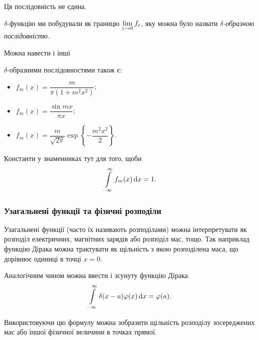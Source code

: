 \begin{remark}
	Ця послідовність не єдина.
\end{remark}

\begin{remark}
	$\delta$-функцію ми побудували як границю $\displaystyle\lim\limits_{\varepsilon \to 0} f_\varepsilon$, яку можна було назвати \it{$\delta$-образною} послідовністю.
\end{remark}

Можна навести і інші
\begin{examples}
	$\delta$-образними послідовностями також є:
	\begin{itemize}
		\item $f_m(x) = \dfrac{m}{\pi (1 + m^2 x^2)}$;
		\item $f_m(x) = \dfrac{\sin m x}{\pi x}$;
		\item $f_m(x) = \dfrac{m}{\sqrt{2 \pi}} \exp \left\{ - \dfrac{m^2 x^2}{2}\right\}$.
	\end{itemize}
\end{examples}

\begin{remark}
	Константи у знаменниках тут для того, щоби
	\begin{equation}
		\displaystyle\int\limits_{-\infty}^\infty f_m(x) \mathop{}\!\mathrm{d} x = 1.
	\end{equation}
\end{remark}
 	  		 
\subsubsection{Узагальнені функції та фізичні розподіли}

Узагальнені функції (часто їх називають розподілами) можна інтерпретувати як розподіл електричних, магнітних зарядів або розподіл мас, тощо. Так наприклад функцію Дірака можна трактувати як щільність з якою розподілена маса, що дорівнює одиниці в точці $x = 0$. 

\begin{definition}
	Аналогічним чином можна ввести і зсунуту функцію Дірака.
	\begin{equation}
		\displaystyle\int\limits_{-\infty}^\infty \delta(x - a) \varphi(x) \mathop{}\!\mathrm{d} x = \varphi(a).
	\end{equation}
\end{definition}

\begin{remark}
	Використовуючи цю формулу можна зобразити щільність розподілу зосереджених мас або іншої фізичної величини в точках прямої.
\end{remark}

